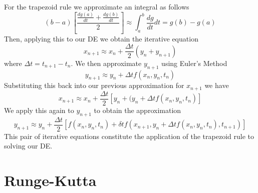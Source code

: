 \documentclass[12pt, a4paper, oneside, openright, titlepage]{book}
\begin{document}
\begin{proc}
        For the trapezoid rule we approximate an integral as follows \begin{equation}
                (b-a)\left[\frac{\frac{dg(a)}{dt} + \frac{dg(b)}{dt}}{2}\right] \approx \int_a^b\frac{dg}{dt}dt = g(b) - g(a)
        \end{equation}
        Then, applying this to our DE we obtain the iterative equation \begin{equation}
                x_{n+1} \approx x_n + \frac{\Delta t}{2}\left(y_n + y_{n+1}\right)
        \end{equation}
        where $\Delta t = t_{n+1} - t_n$. We then approximate $y_{n+1}$ using Euler's Method \begin{equation}
                y_{n+1} \approx y_n + \Delta t f(x_n,y_n, t_n)
        \end{equation}
        Substituting this back into our previous approximation for $x_{n+1}$ we have \begin{equation}
                x_{n+1} \approx x_n + \frac{\Delta t}{2}\left[y_n + (y_n + \Delta tf(x_n,y_n,t_n)\right]
        \end{equation}
        We apply this again to $y_{n+1}$ to obtain the approximation \begin{equation}
                y_{n+1} \approx y_n + \frac{\Delta t}{2}\left[f(x_n,y_n,t_n) + \delta tf(x_{n+1},y_n + \Delta tf(x_n,y_n,t_n), t_{n+1})\right]
        \end{equation}
        This pair of iterative equations constitute the application of the trapezoid rule to solving our DE.
\end{proc}


\section{Runge-Kutta}
\end{document}
